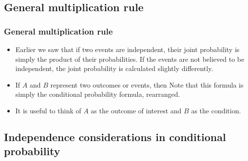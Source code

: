 
\subsection{General multiplication rule}


\begin{frame}
\frametitle{General multiplication rule}

\begin{itemize}

\item Earlier we saw that if two events are independent, their joint probability is simply the product of their probabilities. If the events are not believed to be independent, the joint probability is calculated slightly differently.

\pause

\item If $A$ and $B$ represent two outcomes or events, then
\formula{\[ P(A~and~B) = P(A|B) \times P(B) \]}
Note that this formula is simply the conditional probability formula, rearranged.
\pause

\item It is useful to think of $A$ as the outcome of interest and $B$ as the condition.

\end{itemize}

\end{frame}


\subsection{Independence considerations in conditional probability}


